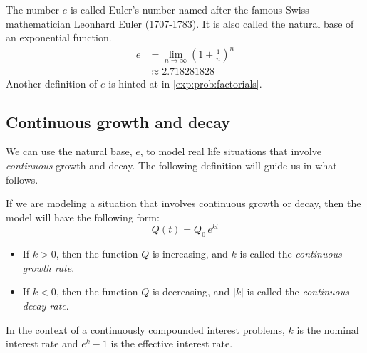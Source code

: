 \begin{pccdefinition}\label{exp:def:e}
	The number $e$ is called Euler's number named after the famous
	Swiss mathematician Leonhard Euler (1707-1783). It is also called 
	the natural base of an exponential function.
	\begin{align*}
		e & = \lim_{n\to\infty}\left( 1+\frac{1}{n} \right)^n \\
		  & \approx 2.718281828                               
	\end{align*}
	Another definition of $e$ is hinted at in \cref{exp:prob:factorials}.
\end{pccdefinition}
			
\subsection*{Continuous growth and decay}
We can use the natural base, $e$, to model real life situations that involve 
\emph{continuous} growth and decay. The following definition will guide us 
in what follows.
\begin{pccdefinition}\label{exp:def:contgrowthdecay}
	If we are modeling a situation that involves continuous growth or decay, then 
	the model will have the following form:
	\[
		Q(t)=Q_0\,e^{kt}
	\]
	\begin{itemize}
		\item If $k>0$, then the function $Q$ is increasing, and $k$ is called the \emph{continuous growth rate}.
		\item If $k<0$, then the function $Q$ is decreasing, and $|k|$ is called the \emph{continuous decay rate}.
	\end{itemize}
	In the context of a continuously compounded interest problems, $k$ is the nominal interest rate and $e^k-1$ is the effective interest rate.
\end{pccdefinition}
			

